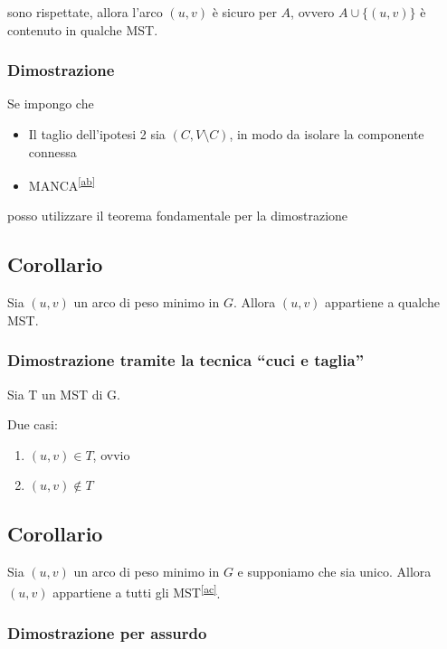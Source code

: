 \documentclass[tikz]{article}
\providecommand{\tightlist}{%
  \setlength{\itemsep}{0pt}\setlength{\parskip}{0pt}}
\begin{document}
{{{sono rispettate, allora l'arco $(u,v)$ è sicuro per $A$, ovvero $A \cup \{(u,v)\}$ è contenuto in qualche MST.}

\subsubsection{Dimostrazione}

{Se impongo che}

\begin{itemize}
\tightlist
\item
  {Il taglio dell'ipotesi 2 sia $(C,V\setminus C)$, in modo da isolare la componente connessa}
\item
  {MANCA}\textsuperscript{\protect\hyperlink{cmnt28}{{[}ab{]}}}
\end{itemize}

{posso utilizzare il teorema fondamentale per la dimostrazione}

\subsection{Corollario}

{Sia $(u,v)$ un arco di peso minimo in $G$. Allora $(u,v)$ appartiene a qualche MST.}

\subsubsection{Dimostrazione tramite la tecnica ``cuci e taglia''}

{Sia T un MST di G. }

{Due casi:}

\begin{enumerate}
\tightlist
\item
  $(u,v)\in T${, ovvio}
\item
  $(u,v)\notin T$
\end{enumerate}

\subsection{Corollario}

{Sia $(u,v)$ un arco di peso minimo in $G$ e supponiamo che sia unico. Allora $(u,v)$ appartiene a tutti gli MST}\textsuperscript{\protect\hyperlink{cmnt29}{{[}ac{]}}}{.}

\subsubsection{Dimostrazione per assurdo}

}}
\end{document}
